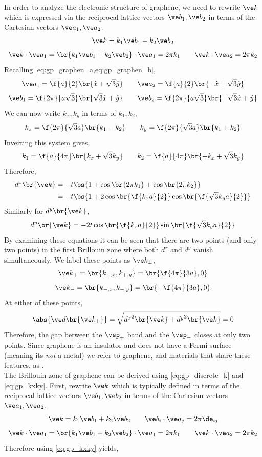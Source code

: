 \documentclass{article}
\begin{document}
In order to analyze the electronic structure of graphene, we need to rewrite $\ve k$ which is expressed via the reciprocal lattice vectors $\ve b_1, \ve b_2$ in terms of the Cartesian vectors $\ve a_1, \ve a_2$.
\[ \ve k = k_1 \ve b_1 + k_2 \ve b_2 \]
\[ \ve k \cdot \ve a_1 = \br{k_1 \ve b_1 + k_2 \ve b_2} \cdot \ve a_1 = 2 \pi k_1 \qquad \ve k \cdot \ve a_2 = 2 \pi k_2 \]
Recalling \cref{eq:gp_graphen_a,eq:gp_graphen_b},
\[ \ve a_{1} = \f{a}{2} \br{\hat x + \sqrt{3} \hat y} \qquad \ve a_{2} = \f{a}{2} \br{-\hat x + \sqrt{3} \hat y} \]
\[ \ve b_{1} = \f{2 \pi}{a\sqrt{3}} \br{\sqrt{3} \hat x +  \hat y} \qquad \ve b_{2} = \f{2 \pi}{a\sqrt{3}} \br{-\sqrt{3}\hat x +  \hat y}\]
We can now write $k_x, k_y$ in terms of $k_1, k_2$,
\[ k_x = \f{2 \pi }{\sqrt{3}a} \br{k_1 - k_2} \qquad k_y = \f{2 \pi}{\sqrt{3}a} \br{k_1 + k_2} \]
Inverting this system gives,
\[ k_1 = \f{a}{4 \pi} \br{k_x + \sqrt{3} k_y} \qquad k_2 = \f{a}{4 \pi} \br{-k_x + \sqrt{3} k_y} \]
Therefore,
\begin{align*}
    d^{x}\br{\ve k}
    &= - t\bs{1 + \cos\br{2 \pi k_1} + \cos\br{2 \pi k_2}} \\
    &= - t\bs{1 + 2\cos\br{\f{k_xa}{2}}\cos\br{\f{\sqrt{3}k_ya}{2}}}
\end{align*}
Similarly for $d^{y}\br{\ve k}$,
\[ d^{y}\br{\ve k} = -2 t \cos\br{\f{k_x a}{2}} \sin\br{\f{\sqrt{3} k_y a}{2}} \]
By examining these equations it can be seen that there are two points (and only two points) in the first Brillouin zone where both $d^{x}$ and $d^y$ vanish simultaneously. We label these points as $\ve k_{\pm}$,
\[ \ve k_+ = \br{k_{+, x}, k_{+, y}} = \br{\f{4 \pi }{3a}, 0} \]
\[ \ve k_- = \br{k_{-, x}, k_{-, y}} = \br{-\f{4 \pi }{3a}, 0} \]
At either of these points,
\[ \abs{\ve d \br{\ve k_{\pm}}} = \sqrt{{d^x}^2\br{\ve k} + {d^y}^2\br{\ve k}} = 0 \]
Therefore, the gap between the $\vep_{+}$ band and the $\vep_{-}$ closes at only two points. Since graphene is an insulator and does not have a Fermi surface (meaning its \textit{not} a metal) we refer to graphene, and materials that share these features, as . \\


The Brillouin zone of graphene can be derived using \cref{eq:gp_discrete_k} and \cref{eq:gp_kxky}. First, rewrite $\ve k$ which is typically defined in terms of the reciprocal lattice vectors $\ve b_1, \ve b_2$ in terms of the Cartesian vectors $\ve a_1, \ve a_2$.
\[ \ve k = k_1 \ve b_1 + k_2 \ve b_2 \qquad \ve b_i \cdot \ve a_j = 2 \pi \de_{ij}\]
\[ \ve k \cdot \ve a_1 = \br{k_1 \ve b_1 + k_2 \ve b_2} \cdot \ve a_1 = 2 \pi k_1 \qquad \ve k \cdot \ve a_2 = 2 \pi k_2 \]
Therefore using \cref{eq:gp_kxky} yields,
\end{document}
